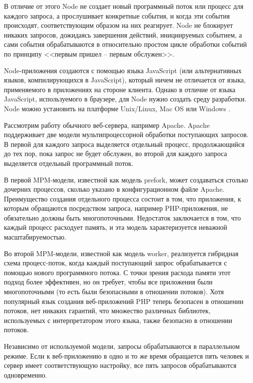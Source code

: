 В отличие от этого Node не создает новый программный поток или процесс для каждого запроса, а прослушивает конкретные события, и когда эти события происходят, соответствующим образом на них реагирует. Node не блокирует никаких запросов, дожидаясь завершения действий, инициируемых событием, а сами события обрабатываются в относительно простом цикле обработки событий по принципу <<первым пришел -- первым обслужен>>.

Node-приложения создаются с помощью языка JavaScript (или альтернативных языков, компилирующихся в JavaScript), который ничем не отличается от языка, применяемого в приложениях на стороне клиента. Однако в отличие от языка JavaScript, используемого в браузере, для Node нужно создать среду разработки. Node можно установить на платформе Unix/Linux, Mac OS или Windows \cite{js}.

Рассмотрим работу обычного веб-сервера, например Apache. Apache поддерживает две модели мультипроцессорной обработки поступающих запросов. В первой для каждого запроса выделяется отдельный процесс, продолжающийся до тех пор, пока запрос не будет обслужен, во второй для каждого запроса выделяется отдельный программный поток.

В первой MPM-модели, известной как модель prefork, может создаваться столько дочерних процессов, сколько указано в конфигурационном файле Apache. Преимущество создания отдельного процесса состоит в том, что приложения, к которым обращаются посредством запроса, например PHP-приложения, не обязательно должны быть многопоточными. Недостаток заключается в том, что каждый процесс расходует память, и эта модель характеризуется неважной масштабируемостью.

Во второй MPM-модели, известной как модель worker, реализуется гибридная схема процесс-поток, когда каждый поступающий запрос обрабатывается с помощью нового программного потока. С точки зрения расхода памяти этот подход более эффективен, но он требует, чтобы все приложения были многопоточными (то есть были безопасными в отношении потоков). Хотя популярный язык создания веб-приложений PHP теперь безопасен в отношении потоков, нет никаких гарантий, что множество различных библиотек, используемых с интерпретатором этого языка, также безопасно в отношении потоков.

Независимо от используемой модели, запросы обрабатываются в параллельном режиме. Если к веб-приложению в одно и то же время обращается пять человек и сервер имеет соответствующую настройку, все пять запросов обрабатываются одновременно.

